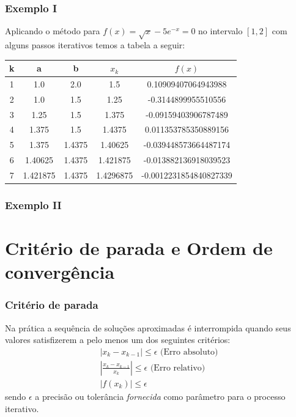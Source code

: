 \documentclass{beamer}
\theoremstyle{mystyle}
\begin{document}
\begin{frame}
	\frametitle{Exemplo I}
	Aplicando o método para $ f(x) = \sqrt{x} - 5e^{-x} = 0 $ no intervalo $ [1, 2] $ com alguns passos iterativos temos a tabela a seguir:
	\begin{table}
		\centering
		\begin{tabular}{c|c|c||c|c}
			k & a & b & $ x_{k} $ & $f(x)$ \\
			\hline
			\hline
			1 & 1.0 & 2.0 & 1.5 & 0.10909407064943988 \\
			2 & 1.0      & 1.5    & 1.25      & -0.3144899955510556    \\ 
			3 & 1.25     & 1.5    & 1.375     & -0.09159403906787489   \\
			4 & 1.375    & 1.5    & 1.4375    &  0.011353785350889156  \\
			5 & 1.375    & 1.4375 & 1.40625   & -0.039448573664487174  \\
			6 & 1.40625  & 1.4375 & 1.421875  & -0.013882136918039523  \\
			7 & 1.421875 & 1.4375 & 1.4296875 & -0.0012231854840827339 \\ 
		\end{tabular}
	\end{table}
\end{frame}

\begin{frame}
	\frametitle{Exemplo II}
	\centering
	\href{https://colab.research.google.com/drive/16A79ot1vYg77thZVmoFotmrI4zaSPcOA?usp=sharing}{}
	
\end{frame}

\section{Critério de parada e Ordem de convergência}

\begin{frame}
	\frametitle{Critério de parada}
	Na prática a sequência de soluções aproximadas é interrompida quando seus valores satisfizerem a pelo menos um dos seguintes critérios:
	\begin{gather*}
		\left| x_{k} - x_{k - 1}\right| \leq \epsilon \text{ (Erro absoluto)}\\
		\left| \frac{x_{k} - x_{k - 1}}{x_{k}}\right|  \leq \epsilon \text{ (Erro relativo)}\\
		|f(x_{k})| \leq \epsilon
	\end{gather*}
	sendo $ \epsilon $ a precisão ou tolerância \textit{fornecida} como parâmetro para o processo iterativo.
\end{frame}
\end{document}
